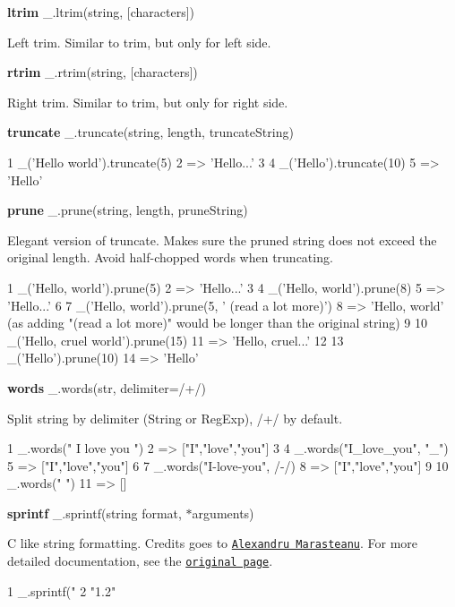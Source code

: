 {\bfseries ltrim} \+\_\+.\+ltrim(string, \mbox{[}characters\mbox{]})

Left trim. Similar to trim, but only for left side.

{\bfseries rtrim} \+\_\+.\+rtrim(string, \mbox{[}characters\mbox{]})

Right trim. Similar to trim, but only for right side.

{\bfseries truncate} \+\_\+.\+truncate(string, length, truncate\+String)


\begin{DoxyCode}
1 \_('Hello world').truncate(5)
2 => 'Hello...'
3 
4 \_('Hello').truncate(10)
5 => 'Hello'
\end{DoxyCode}


{\bfseries prune} \+\_\+.\+prune(string, length, prune\+String)

Elegant version of truncate. Makes sure the pruned string does not exceed the original length. Avoid half-\/chopped words when truncating.


\begin{DoxyCode}
1 \_('Hello, world').prune(5)
2 => 'Hello...'
3 
4 \_('Hello, world').prune(8)
5 => 'Hello...'
6 
7 \_('Hello, world').prune(5, ' (read a lot more)')
8 => 'Hello, world' (as adding "(read a lot more)" would be longer than the original string)
9 
10 \_('Hello, cruel world').prune(15)
11 => 'Hello, cruel...'
12 
13 \_('Hello').prune(10)
14 => 'Hello'
\end{DoxyCode}


{\bfseries words} \+\_\+.\+words(str, delimiter=/+/)

Split string by delimiter (String or Reg\+Exp), /+/ by default.


\begin{DoxyCode}
1 \_.words("   I   love   you   ")
2 => ["I","love","you"]
3 
4 \_.words("I\_love\_you", "\_")
5 => ["I","love","you"]
6 
7 \_.words("I-love-you", /-/)
8 => ["I","love","you"]
9 
10 \_.words("   ")
11 => []
\end{DoxyCode}


{\bfseries sprintf} \+\_\+.\+sprintf(string format, $\ast$arguments)

C like string formatting. Credits goes to \href{http://www.diveintojavascript.com/projects/sprintf-for-javascript}{\tt Alexandru Marasteanu}. For more detailed documentation, see the \href{http://www.diveintojavascript.com/projects/sprintf-for-javascript}{\tt original page}.


\begin{DoxyCode}
1 \_.sprintf("%
2 "1.2"
\end{DoxyCode}


